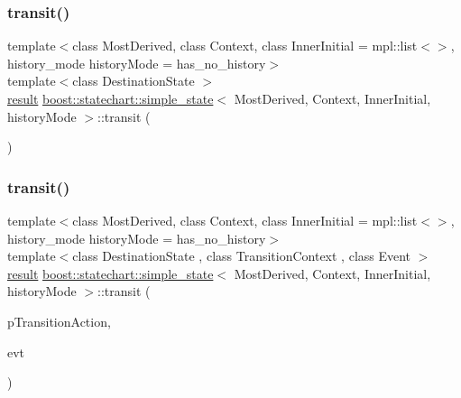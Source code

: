\subsubsection{\texorpdfstring{transit()}{transit()}\hspace{0.1cm}{\footnotesize\ttfamily [1/2]}}
{\footnotesize\ttfamily template$<$class Most\+Derived, class Context, class Inner\+Initial = mpl\+::list$<$$>$, history\+\_\+mode history\+Mode = has\+\_\+no\+\_\+history$>$ \\
template$<$class Destination\+State $>$ \\
\mbox{\hyperlink{namespaceboost_1_1statechart_abe807f6598b614d6d87bb951ecd92331}{result}} \mbox{\hyperlink{classboost_1_1statechart_1_1simple__state}{boost\+::statechart\+::simple\+\_\+state}}$<$ Most\+Derived, Context, Inner\+Initial, history\+Mode $>$\+::transit (\begin{DoxyParamCaption}{ }\end{DoxyParamCaption})\hspace{0.3cm}{\ttfamily [inline]}}

\mbox{\label{classboost_1_1statechart_1_1simple__state_a8afd3e06eb91829a43bc82031c848fb1}} 
\subsubsection{\texorpdfstring{transit()}{transit()}\hspace{0.1cm}{\footnotesize\ttfamily [2/2]}}
{\footnotesize\ttfamily template$<$class Most\+Derived, class Context, class Inner\+Initial = mpl\+::list$<$$>$, history\+\_\+mode history\+Mode = has\+\_\+no\+\_\+history$>$ \\
template$<$class Destination\+State , class Transition\+Context , class Event $>$ \\
\mbox{\hyperlink{namespaceboost_1_1statechart_abe807f6598b614d6d87bb951ecd92331}{result}} \mbox{\hyperlink{classboost_1_1statechart_1_1simple__state}{boost\+::statechart\+::simple\+\_\+state}}$<$ Most\+Derived, Context, Inner\+Initial, history\+Mode $>$\+::transit (\begin{DoxyParamCaption}\item[{void(Transition\+Context\+::$\ast$)(const Event \&)}]{p\+Transition\+Action,  }\item[{const Event \&}]{evt }\end{DoxyParamCaption})\hspace{0.3cm}{\ttfamily [inline]}}

